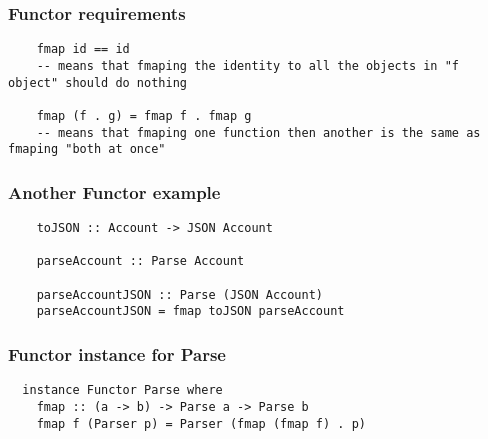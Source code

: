 \documentclass{beamer}
\begin{document}
\begin{frame}
  \frametitle{Functor requirements}

  \begin{lstlisting}
    fmap id == id
    -- means that fmaping the identity to all the objects in "f object" should do nothing

    fmap (f . g) = fmap f . fmap g
    -- means that fmaping one function then another is the same as fmaping "both at once"
  \end{lstlisting}

\end{frame}


\begin{frame}
  \frametitle{Another Functor example}

  \begin{lstlisting}
    toJSON :: Account -> JSON Account

    parseAccount :: Parse Account

    parseAccountJSON :: Parse (JSON Account)
    parseAccountJSON = fmap toJSON parseAccount
  \end{lstlisting}

\end{frame}


\begin{frame}
  \frametitle{Functor instance for Parse}

  \begin{lstlisting}
  instance Functor Parse where
    fmap :: (a -> b) -> Parse a -> Parse b
    fmap f (Parser p) = Parser (fmap (fmap f) . p)
  \end{lstlisting}


\end{frame}
\end{document}
